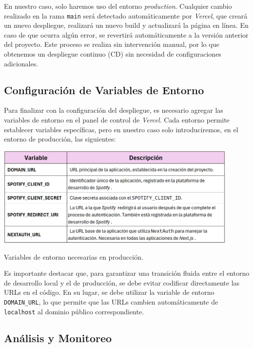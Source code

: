 En nuestro caso, solo haremos uso del entorno \textit{production}. Cualquier cambio realizado en la rama \texttt{main} será detectado automáticamente por \textit{Vercel}, que creará un nuevo despliegue, realizará un nuevo build y actualizará la página en línea. En caso de que ocurra algún error, se revertirá automáticamente a la versión anterior del proyecto. Este proceso se realiza sin intervención manual, por lo que obtenemos un despliegue continuo (CD) sin necesidad de configuraciones adicionales.

\subsection{Configuración de Variables de Entorno}

Para finalizar con la configuración del despliegue, es necesario agregar las variables de entorno en el panel de control de \textit{Vercel}. Cada entorno permite establecer variables específicas, pero en nuestro caso solo introduciremos, en el entorno de producción, las siguientes:

\begin{table}[htbp]
    \centering
    \includegraphics[width=0.9\textwidth]{figures/despliegue/variables_entorno.png}
    \captionsetup{skip=10pt}
    \caption{Variables de entorno necesarias en producción.}
    \label{tab:variables_entorno}
\end{table}

Es importante destacar que, para garantizar una transición fluida entre el entorno de desarrollo local y el de producción, se debe evitar codificar directamente las URLs en el código. En su lugar, se debe utilizar la variable de entorno \texttt{DOMAIN\_URL}, lo que permite que las URLs cambien automáticamente de \texttt{localhost} al dominio público correspondiente.

\subsection{Análisis y Monitoreo}

